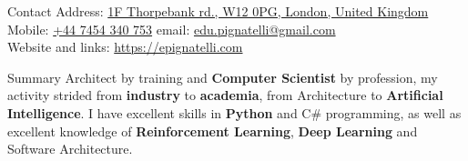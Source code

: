 \documentclass{resume}
\begin{document}
\begin{rSection}{Contact}
Address: \href{https://goo.gl/maps/Gwa9BTP2ARx}{1F Thorpebank rd., W12 0PG, London, United Kingdom} \\
Mobile: \href{tel:07454340753}{+44 7454 340 753} \quad \quad \quad \quad \quad \quad \quad email: \href{mailto:edu.pignatelli@gmail.com}{edu.pignatelli@gmail.com} \\
Website and links: \href{https://epignatelli.com}{https://epignatelli.com}
\end{rSection}

\begin{rSection}{Summary}
Architect by training and \textbf{Computer Scientist} by profession, my activity strided from \textbf{industry} to \textbf{academia}, from Architecture to \textbf{Artificial Intelligence}. I have excellent skills in \textbf{Python} and C\# programming, as well as excellent knowledge of \textbf{Reinforcement Learning}, \textbf{Deep Learning} and Software Architecture.
\end{rSection}
\end{document}
